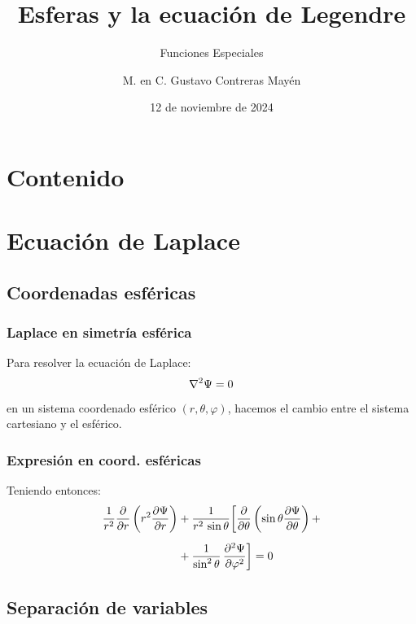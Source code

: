 \documentclass[12pt]{beamer}
\date{12 de noviembre de 2024}
\title{\large{Esferas y la ecuación de Legendre}}
\subtitle{Funciones Especiales}
\author{M. en C. Gustavo Contreras Mayén}
\begin{document}
\maketitle
\fontsize{14}{14}\selectfont
{}

\section*{Contenido}

\section{Ecuación de Laplace}
\subsection{Coordenadas esféricas}

\begin{frame}
\frametitle{Laplace en simetría esférica}
Para resolver la ecuación de Laplace:
\pause
\begin{align*}
\laplacian{\Psi} = 0
\end{align*}
en un sistema coordenado esférico $(r, \theta, \varphi)$, hacemos el cambio entre el sistema cartesiano y el esférico.
\end{frame}
\begin{frame}
\frametitle{Expresión en coord. esféricas}
Teniendo entonces:
\pause
\begin{align}
\begin{aligned}[b]
\dfrac{1}{r^{2}} \pdv{r} \left( r^{2} \pdv{\Psi}{r} \right) &+ \dfrac{1}{r^{2} \, \sin \theta} \bigg[ \pdv{\theta} \left( \sin \theta \pdv{\Psi}{\theta} \right) + \\[0.5em]
&+ \dfrac{1}{\sin^{2} \theta} \, \pdv[2]{\Psi}{\varphi} \bigg] = 0
\end{aligned}
\label{eq:ecuacion_22_15}
\end{align}
\end{frame}

\subsection{Separación de variables}
\end{document}
